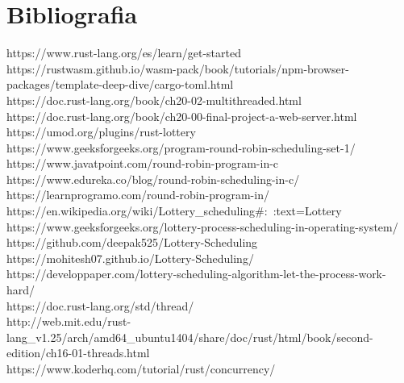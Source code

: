 \documentclass{article}
\begin{document}
\section{Bibliografia}
https://www.rust-lang.org/es/learn/get-started\\
https://rustwasm.github.io/wasm-pack/book/tutorials/npm-browser-packages/template-deep-dive/cargo-toml.html\\
https://doc.rust-lang.org/book/ch20-02-multithreaded.html\\
https://doc.rust-lang.org/book/ch20-00-final-project-a-web-server.html\\
https://umod.org/plugins/rust-lottery\\
https://www.geeksforgeeks.org/program-round-robin-scheduling-set-1/\\
https://www.javatpoint.com/round-robin-program-in-c\\
https://www.edureka.co/blog/round-robin-scheduling-in-c/\\
https://learnprogramo.com/round-robin-program-in/\\
https://en.wikipedia.org/wiki/Lottery_scheduling#:~:text=Lottery\\
https://www.geeksforgeeks.org/lottery-process-scheduling-in-operating-system/\\
https://github.com/deepak525/Lottery-Scheduling\\
https://mohitesh07.github.io/Lottery-Scheduling/\\
https://developpaper.com/lottery-scheduling-algorithm-let-the-process-work-hard/\\
https://doc.rust-lang.org/std/thread/\\
http://web.mit.edu/rust-lang_v1.25/arch/amd64_ubuntu1404/share/doc/rust/html/book/second-edition/ch16-01-threads.html\\
https://www.koderhq.com/tutorial/rust/concurrency/\\
\end{document}
